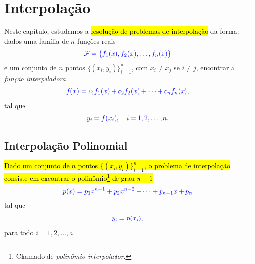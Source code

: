 
\chapter{Interpolação}\label{cap_interp}
\thispagestyle{fancy}

Neste capítulo, estudamos a \hl{resolução de problemas de interpolação} da forma: dados uma família de $n$ funções reais
\begin{equation}\color{blue}\mathcal{F} = \{f_1(x), f_2(x), \dotsc, f_n(x)\}
\end{equation}
e um conjunto de $n$ pontos $\{(x_i, y_i)\}_{i=1}^n$, com $x_i\neq x_j$ se $i\neq j$, encontrar a \emph{função interpoladora}
\begin{equation}\color{blue}f(x) = c_1f_1(x) + c_2f_2(x) + \cdots + c_nf_n(x),
\end{equation}
tal que
\begin{equation}\color{blue}y_i = f(x_i),\quad i=1, 2, \ldots, n.
\end{equation}

\section{Interpolação Polinomial}\label{cap_interp_sec_interpoli}

\hl{Dado um conjunto de $n$ pontos $\{(x_i, y_i)\}_{i=1}^n$, o problema de interpolação consiste em encontrar o polinômio\footnote{Chamado de \emph{polinômio interpolador}.} de grau $n-1$}
\begin{equation}\label{cap_interp_sec_interpoli:eq:interpoli_poli}\color{blue}p(x) = p_1x^{n-1} + p_2x^{n-2} + \cdots + p_{n-1}x + p_n
\end{equation}
tal que
\begin{equation}\label{cap_interp_sec_interpoli:eq:interpoli_conds}\color{blue}y_i = p(x_i),
\end{equation}
para todo $i=1, 2, \dotsc, n$.

